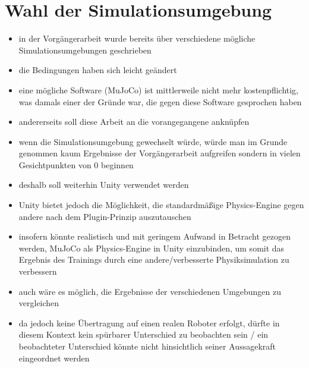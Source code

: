 \section{Wahl der Simulationsumgebung}
\begin{itemize}
    \item in der Vorgängerarbeit wurde bereits über verschiedene mögliche Simulationsumgebungen geschrieben
    \item die Bedingungen haben sich leicht geändert
    \item eine mögliche Software (MuJoCo) ist mittlerweile nicht mehr kostenpflichtig, was damals einer der Gründe war, die gegen diese Software gesprochen haben
    \item andererseits soll diese Arbeit an die vorangegangene anknüpfen
    \item wenn die Simulationsumgebung gewechselt würde, würde man im Grunde genommen kaum Ergebnisse der Vorgängerarbeit aufgreifen sondern in vielen Gesichtpunkten von 0 beginnen
    \item deshalb soll weiterhin Unity verwendet werden
    \item Unity bietet jedoch die Möglichkeit, die standardmäßige Physics-Engine gegen andere nach dem Plugin-Prinzip auszutauschen
    \item insofern könnte realistisch und mit geringem Aufwand in Betracht gezogen werden, MuJoCo als Physics-Engine in Unity einzubinden, um somit das Ergebnis des Trainings durch eine andere/verbesserte Physiksimulation zu verbessern
    \item auch wäre es möglich, die Ergebnisse der verschiedenen Umgebungen zu vergleichen
    \item da jedoch keine Übertragung auf einen realen Roboter erfolgt, dürfte in diesem Kontext kein spürbarer Unterschied zu beobachten sein / ein beobachteter Unterschied könnte nicht hinsichtlich seiner Aussagekraft eingeordnet werden
\end{itemize}

